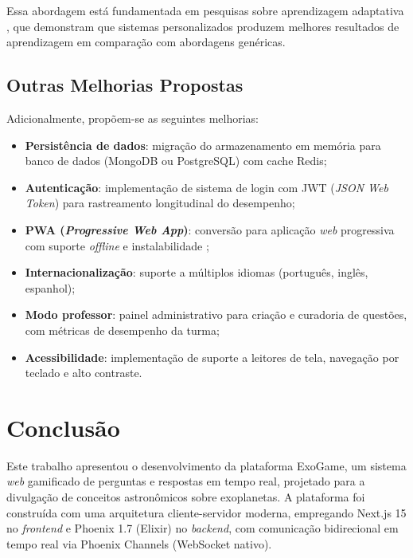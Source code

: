 \documentclass[
	12pt,
	openany,
	oneside,
	a4paper,
	english,
	brazil
]{abntex2}
\begin{document}
Essa abordagem está fundamentada em pesquisas sobre aprendizagem adaptativa \cite{brusilovsky2007, klašnja2011}, que demonstram que sistemas personalizados produzem melhores resultados de aprendizagem em comparação com abordagens genéricas.

\section{Outras Melhorias Propostas}

Adicionalmente, propõem-se as seguintes melhorias:

\begin{itemize}
  \item \textbf{Persistência de dados}: migração do armazenamento em memória para banco de dados (MongoDB ou PostgreSQL) com cache Redis;
  \item \textbf{Autenticação}: implementação de sistema de login com JWT (\textit{JSON Web Token}) para rastreamento longitudinal do desempenho;
  \item \textbf{PWA (\textit{Progressive Web App})}: conversão para aplicação \textit{web} progressiva com suporte \textit{offline} e instalabilidade \cite{majchrzak2018};
  \item \textbf{Internacionalização}: suporte a múltiplos idiomas (português, inglês, espanhol);
  \item \textbf{Modo professor}: painel administrativo para criação e curadoria de questões, com métricas de desempenho da turma;
  \item \textbf{Acessibilidade}: implementação de suporte a leitores de tela, navegação por teclado e alto contraste.
\end{itemize}


\chapter{Conclusão}\label{cap:conclusao}

Este trabalho apresentou o desenvolvimento da plataforma ExoGame, um sistema \textit{web} gamificado de perguntas e respostas em tempo real, projetado para a divulgação de conceitos astronômicos sobre exoplanetas. A plataforma foi construída com uma arquitetura cliente-servidor moderna, empregando Next.js 15 no \textit{frontend} e Phoenix 1.7 (Elixir) no \textit{backend}, com comunicação bidirecional em tempo real via Phoenix Channels (WebSocket nativo).
\end{document}
